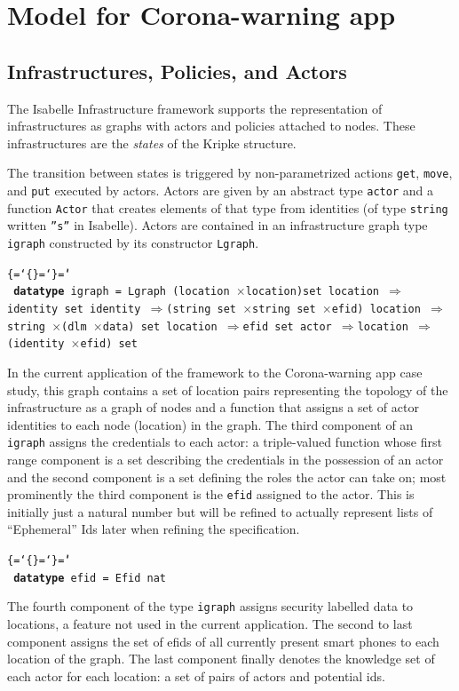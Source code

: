 \documentclass{llncs}
\newenvironment{ttbox}{\begin{alltt}\ttbraces\small\tt}%
                      {\end{alltt}}
\def\ttbraces{\let\.=\nobreak\chardef\{=`\{\chardef\}=`\}\chardef\|=`\\}
\newcommand\ttfun{\mbox{{$\Rightarrow$}}}
\newcommand\ttlam{\mbox{\( \lambda \)}}
\newcommand\tttimes{\mbox{\( \times \)}}
\begin{document}
\section{Model for Corona-warning app}
\label{sec:model}


\subsection{Infrastructures, Policies, and Actors}
\label{sec:infra}
The Isabelle Infrastructure framework supports the representation of infrastructures 
as graphs with actors and policies attached to nodes. These infrastructures 
are the {\it states} of the Kripke structure. %

The transition between states is triggered by non-parametrized
actions \texttt{get}, \texttt{move}, and \texttt{put} 
executed by actors. 
Actors are given by an abstract type \texttt{actor} and a function 
\texttt{Actor} that creates elements of that type from identities 
(of type \texttt{string} written \texttt{''s''} in Isabelle). 
Actors are contained in an infrastructure graph type \texttt{igraph}
constructed by its constructor \texttt{Lgraph}. 
\begin{ttbox}
{\bf datatype} igraph = 
         Lgraph (location \tttimes location)set 
                 location \ttfun identity set
                 identity \ttfun (string set \tttimes string set \tttimes efid)  
                 location \ttfun string \tttimes (dlm \tttimes data) set
                 location \ttfun efid set
                 actor \ttfun location \ttfun (identity \tttimes efid) set
                
\end{ttbox}
In the current application of the framework to the Corona-warning app case study, 
this graph contains a set of location pairs representing the %
topology of the infrastructure
as a graph of nodes and a function%
that assigns a set of actor identities to each node (location) in the graph.
The third component of an \texttt{igraph} assigns the credentials to each actor: 
a triple-valued function whose first range component is a set describing the credentials 
in the possession of an actor and the second component 
is a set defining the roles the actor can take on; 
most prominently the third component is the \texttt{efid} assigned to the actor. This is initially
just a natural number but will be refined to actually represent lists of ``Ephemeral'' Ids later
when refining the specification.
\begin{ttbox}
{\bf datatype} efid = Efid nat
\end{ttbox}
The fourth component of the type \texttt{igraph}
assigns security labelled data to locations, a feature not used in the
current application.
The second to last component assigns the set of efids of all currently present smart phones
to each location of the graph. The last component finally denotes the knowledge set of each
actor for each location: a set of pairs of actors and potential ids.
\end{document}
